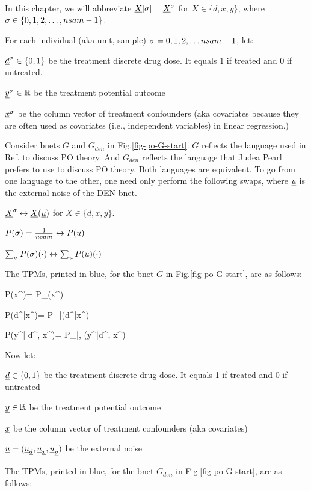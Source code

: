 In this chapter, we will
abbreviate
${\underline{X}}{[\sigma]}={\underline{X}}^\sigma$
for
$X\in \{d, x, y\}$, where 
 $\sigma\in\{0,1,2, \ldots, nsam-1\}$.


For each individual (aka unit, sample) 
$\sigma=0, 1, 2, \ldots nsam-1$, let:

${\underline{d}}^\sigma\in\{0,1\}$ be the
 treatment discrete drug dose.
It equals 1 if 
treated
and 0 if untreated.

${\underline{y}}^\sigma\in { \mathbb{R}}$ be the
 treatment potential outcome

${\underline{x}}^\sigma$ be the column vector of treatment 
confounders 
(aka covariates because they
are often used as covariates (i.e., 
independent
variables) in linear regression.)

Consider bnets $G$ and $G_{den}$
in 
 Fig.\ref{fig-po-G-start}.
$G$ reflects the language
used in Ref.\cite{book-mixtape}
to discuss PO theory. And
$G_{den}$ reflects
the language that Judea Pearl 
prefers to use to discuss PO theory.
Both languages are equivalent. To go from
one language to the other, one need only
perform the following
swaps, where ${\underline{u}}$
is the external noise of the DEN bnet.

${\underline{X}}^\sigma\leftrightarrow {\underline{X}}({\underline{u}})$
for $X\in \{d, x, y\}$.

$P(\sigma)=\frac{1}{nsam}\leftrightarrow P(u)$

$\sum_\sigma P(\sigma) (\cdot)
\leftrightarrow \sum_uP(u) (\cdot)$




The TPMs, printed in blue,
for the bnet
$G$
in Fig.\ref{fig-po-G-start},
are as follows:


\beq\color{blue}
P(x^\s)=
P_{\rvx}(x^\s)
\eeq

\beq\color{blue}
P(d^\s|x^\s)=
P_{\rvd|\rvx}(d^\s|x^\s)
\eeq


\beq\color{blue}
P(y^\s| d^\s, x^\s)=
P_{\rvy|\rvd, \rvx}(y^\s|d^\s, x^\s)
\eeq




Now let:

${\underline{d}}\in\{0,1\}$
be the treatment discrete drug dose.
It equals 
1 if treated and 0 if untreated

${\underline{y}}\in { \mathbb{R}}$ be the
 treatment potential outcome

${\underline{x}}$ be the column vector of 
treatment
confounders (aka covariates)


${\underline{u}}=({\underline{u}}_{\underline{d}}, 
{\underline{u}}_{\underline{x}}, {\underline{u}}_{\underline{y}})$ be the
external noise

The TPMs, printed in blue,
for the bnet
$G_{den}$
in Fig.\ref{fig-po-G-start},
are as follows:



